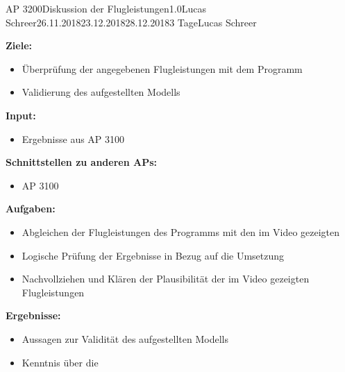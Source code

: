 
\clearpage
\begin{wpd}{AP 3200}{Diskussion der Flugleistungen}{1.0}{Lucas Schreer}{26.11.2018}{23.12.2018}{28.12.2018}{3 Tage}{Lucas Schreer}
    {
    \textbf{Ziele:}
    \begin{itemize}
        \item Überprüfung der angegebenen Flugleistungen mit dem Programm
        \item Validierung des aufgestellten Modells
    \end{itemize}
    \textbf{Input:}
    \begin{itemize}
        \item Ergebnisse aus AP 3100
    \end{itemize}
    \textbf{Schnittstellen zu anderen APs:}
    \begin{itemize}
        \item AP 3100
    \end{itemize}
    \textbf{Aufgaben:}
    \begin{itemize}
        \item Abgleichen der Flugleistungen des Programms mit den im Video gezeigten
        \item Logische Prüfung der Ergebnisse in Bezug auf die Umsetzung
        \item Nachvollziehen und Klären der Plausibilität der im Video gezeigten Flugleistungen
    \end{itemize}
    \textbf{Ergebnisse:}
    \begin{itemize}
        \item Aussagen zur Validität des aufgestellten Modells
        \item Kenntnis über die 
    \end{itemize}
    }
\end{wpd}


